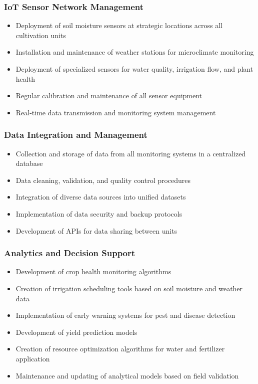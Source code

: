 \subsubsection{IoT Sensor Network Management}
\begin{itemize}
    \item Deployment of soil moisture sensors at strategic locations across all cultivation units
    \item Installation and maintenance of weather stations for microclimate monitoring
    \item Deployment of specialized sensors for water quality, irrigation flow, and plant health
    \item Regular calibration and maintenance of all sensor equipment
    \item Real-time data transmission and monitoring system management
\end{itemize}

\subsubsection{Data Integration and Management}
\begin{itemize}
    \item Collection and storage of data from all monitoring systems in a centralized database
    \item Data cleaning, validation, and quality control procedures
    \item Integration of diverse data sources into unified datasets
    \item Implementation of data security and backup protocols
    \item Development of APIs for data sharing between units
\end{itemize}

\subsubsection{Analytics and Decision Support}
\begin{itemize}
    \item Development of crop health monitoring algorithms
    \item Creation of irrigation scheduling tools based on soil moisture and weather data
    \item Implementation of early warning systems for pest and disease detection
    \item Development of yield prediction models
    \item Creation of resource optimization algorithms for water and fertilizer application
    \item Maintenance and updating of analytical models based on field validation
\end{itemize}

